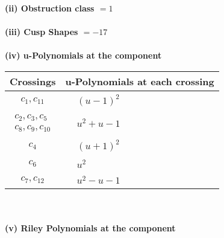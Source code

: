 \documentclass[1p]{elsarticle_modified}
\theoremstyle{definition}
\begin{document}
\flushleft \textbf{(ii) Obstruction class $= 1$}\\~\\
\flushleft \textbf{(iii) Cusp Shapes $= -17$}\\~\\
\newpage\renewcommand{\arraystretch}{1}
\flushleft \textbf{(iv) u-Polynomials at the component}\newline \\
\begin{tabular}{m{50pt}|m{274pt}}
Crossings & \hspace{64pt}u-Polynomials at each crossing \\
\hline $$\begin{aligned}c_{1},c_{11}\end{aligned}$$&$\begin{aligned}
&(u-1)^2
\end{aligned}$\\
\hline $$\begin{aligned}c_{2},c_{3},c_{5}\\c_{8},c_{9},c_{10}\end{aligned}$$&$\begin{aligned}
&u^2+u-1
\end{aligned}$\\
\hline $$\begin{aligned}c_{4}\end{aligned}$$&$\begin{aligned}
&(u+1)^2
\end{aligned}$\\
\hline $$\begin{aligned}c_{6}\end{aligned}$$&$\begin{aligned}
&u^2
\end{aligned}$\\
\hline $$\begin{aligned}c_{7},c_{12}\end{aligned}$$&$\begin{aligned}
&u^2- u-1
\end{aligned}$\\
\hline
\end{tabular}\\~\\
\newpage\renewcommand{\arraystretch}{1}
\flushleft \textbf{(v) Riley Polynomials at the component}\newline \\
\end{document}
